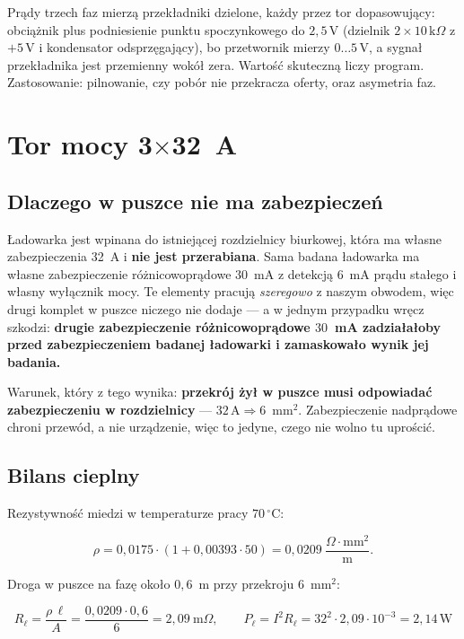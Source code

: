 \documentclass[a4paper,11pt]{article}
\newcommand{\kohm}{\,\mathrm{k}\Omega}
\newcommand{\volt}{\,\mathrm{V}}
\newcommand{\amp}{\,\mathrm{A}}
\newcommand{\watt}{\,\mathrm{W}}
\begin{document}
Prądy trzech faz mierzą przekładniki dzielone, każdy przez tor dopasowujący:
obciążnik plus podniesienie punktu spoczynkowego do $2{,}5\volt$ (dzielnik
$2\times10\kohm$ z $+5\volt$ i kondensator odsprzęgający), bo przetwornik mierzy
$0\ldots5\volt$, a sygnał przekładnika jest przemienny wokół zera. Wartość
skuteczną liczy program. Zastosowanie: pilnowanie, czy pobór nie przekracza oferty,
oraz asymetria faz.

\section{Tor mocy 3\texorpdfstring{$\times$}{x}32~A}

\subsection{Dlaczego w puszce nie ma zabezpieczeń}

Ładowarka jest wpinana do istniejącej rozdzielnicy biurkowej, która ma własne
zabezpieczenia 32~A i \textbf{nie jest przerabiana}. Sama badana ładowarka ma
własne zabezpieczenie różnicowoprądowe $30$~mA z detekcją $6$~mA prądu stałego
i własny wyłącznik mocy. Te elementy pracują \emph{szeregowo} z naszym obwodem,
więc drugi komplet w puszce niczego nie dodaje --- a w jednym przypadku wręcz
szkodzi: \textbf{drugie zabezpieczenie różnicowoprądowe $30$~mA zadziałałoby przed
zabezpieczeniem badanej ładowarki i zamaskowało wynik jej badania.}

Warunek, który z tego wynika: \textbf{przekrój żył w puszce musi odpowiadać
zabezpieczeniu w rozdzielnicy} --- $32\amp \Rightarrow 6$~mm$^2$. Zabezpieczenie
nadprądowe chroni przewód, a nie urządzenie, więc to jedyne, czego nie wolno tu
uprościć.

\subsection{Bilans cieplny}

Rezystywność miedzi w temperaturze pracy $70\,^\circ$C:

\[
\rho = 0{,}0175\cdot\left(1+0{,}00393\cdot50\right)
     = 0{,}0209\ \frac{\Omega\cdot\mathrm{mm}^2}{\mathrm{m}} .
\]

Droga w puszce na fazę około $0{,}6$~m przy przekroju $6$~mm$^2$:

\[
R_{\ell}=\frac{\rho\,\ell}{A}=\frac{0{,}0209\cdot0{,}6}{6}=2{,}09\ \mathrm{m}\Omega,
\qquad
P_{\ell}=I^2R_{\ell}=32^2\cdot2{,}09\cdot10^{-3}=2{,}14\watt
\]
\end{document}
